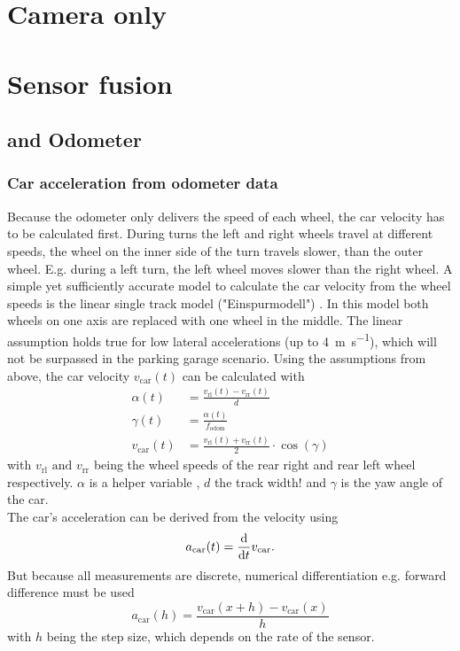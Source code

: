 \section{Camera only}



\section{Sensor fusion}


\subsection{ and Odometer}

\subsubsection{Car acceleration from odometer data}
Because the odometer only delivers the speed of each wheel, the car velocity has to be calculated first.
During turns the left and right wheels travel at different speeds, the wheel on the inner side of the turn travels slower, than the outer wheel.
E.g. during a left turn, the left wheel moves slower than the right wheel.
A simple yet sufficiently accurate model to calculate the car velocity from the wheel speeds is the linear single track model ("Einspurmodell") \cite{Mitschke2014}.
In this model both wheels on one axis are replaced with one wheel in the middle.
The linear assumption holds true for low lateral accelerations (up to \SI{4}{\metre\per\second}), which will not be surpassed in the parking garage scenario.
Using the assumptions from above, the car velocity $v_\mathrm{car}(t)$ can be calculated with
\begin{align}
    \alpha(t)         & = \frac{v_\mathrm{rl}(t) - v_\mathrm{rr}(t)}{d}                  \\
    \gamma(t)         & = \frac{\alpha(t)}{f_\mathrm{odom}}                              \\
    v_\mathrm{car}(t) & = \frac{v_\mathrm{rl}(t) + v_\mathrm{rr}(t)}{2}\cdot\cos(\gamma)
\end{align}
with $v_\mathrm{rl} \text{ and } v_\mathrm{rr}$ being the wheel speeds of the rear right and rear left wheel respectively.
$\alpha$ is a helper variable , $d$ the track width! and $\gamma$ is the yaw angle of the car.\\
The car's acceleration can be derived from the velocity using
\begin{equation}
    a_\mathrm{car}(t) = \dv{t}v_\mathrm{car}.
\end{equation}
But because all measurements are discrete, numerical differentiation e.g. forward difference must be used
\begin{equation}
    a_\mathrm{car}(h) = \frac{v_\mathrm{car}(x + h) - v_\mathrm{car}(x)}{h}
\end{equation}
with $h$ being the step size, which depends on the rate of the sensor.

